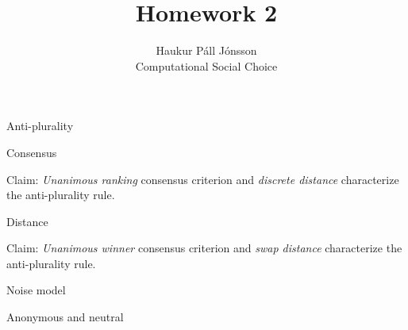 \documentclass[12pt]{article}
\newenvironment{question}[2][Question]{\begin{trivlist}
\item[\hskip \labelsep {\bfseries #1}\hskip \labelsep {\bfseries #2.}]}{\end{trivlist}}
\newenvironment{answer}[2][Answer]{\begin{trivlist}
\item[\hskip \labelsep {\bfseries #1}\hskip \labelsep {\bfseries #2:}]}{\end{trivlist}}
\begin{document}
\renewcommand{\theenumi}{\roman{enumi}}

\let\oldsum\sum
\renewcommand{\sum}[3]{\oldsum\limits_{#1}^{#2}#3}
\let\oldprod\prod
\renewcommand{\prod}[3]{\oldprod\limits_{#1}^{#2}#3}

\newcommand\Dunion{
  \mathop{\mathchoice
    {\ooalign{$\displaystyle\bigcup$\cr\hss\scalebox{.65}{\raisebox{0.45ex}{\sffamily +}}\hss}}
    {\ooalign{$\textstyle\bigcup$\cr\hss\scalebox{.9}{\raisebox{0.5ex}{\tiny\sffamily +}}\hss}}
    {\ooalign{$\scriptstyle\bigcup$\cr\hss\scalebox{.45}{\raisebox{0.3ex}{\sffamily +}}\hss}}
    {\ooalign{$\scriptscriptstyle\bigcup$\cr\hss\scalebox{.38}{\raisebox{0.3ex}{\sffamily +}}\hss}}
    }
}

\title{Homework 2}
\author{Haukur Páll Jónsson\\
Computational Social Choice}

\maketitle

\begin{question}{1}{Anti-plurality}


\end{question}

\begin{answer}{a)}{Consensus}

Claim: \textit{Unanimous ranking} consensus criterion and \textit{discrete distance} characterize the anti-plurality rule.


\end{answer}

\begin{answer}{b)}{Distance}

Claim: \textit{Unanimous winner} consensus criterion and \textit{swap distance} characterize the anti-plurality rule.

\end{answer}

\begin{answer}{c)}{Noise model}


\end{answer}

\begin{question}{2}{Anonymous and neutral}

\end{question}
\end{document}
